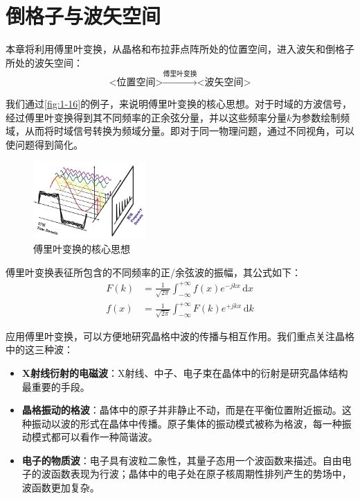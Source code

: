 \chapter{倒格子与波矢空间}\label{chap:2}
    本章将利用傅里叶变换，从晶格和布拉菲点阵所处的位置空间，进入波矢和倒格子所处的波矢空间：
    \[
        \mbox{<位置空间>}\xrightarrow{\mbox{傅里叶变换}}\mbox{<波矢空间>} 
    \]

    我们通过\autoref{fig:1-16}的例子，来说明傅里叶变换的核心思想。对于时域的方波信号，经过傅里叶变换得到其不同频率的正余弦分量，并以这些频率分量$k$为参数绘制频域，从而将时域信号转换为频域分量。即对于同一物理问题，通过不同视角，可以使问题得到简化。

    \begin{figure}[!htbp]
        \centering    
        \includegraphics[height=8em, keepaspectratio=true]{pic/2-01}
        \caption{傅里叶变换的核心思想}
        \label{fig:1-16}
    \end{figure}

    傅里叶变换表征所包含的不同频率的正/余弦波的振幅，其公式如下：
    \begin{align}
        F(k)&=\frac{1}{\sqrt{2\pi}}\int_{-\infty}^{+\infty} f(x)e^{-jkx} \,\mathrm{d}x\\
        f(x)&=\frac{1}{\sqrt{2\pi}}\int_{-\infty}^{+\infty} F(k)e^{+jkx} \,\mathrm{d}k 
    \end{align}
           
    应用傅里叶变换，可以方便地研究晶格中波的传播与相互作用。我们重点关注晶格中的这三种波：
    \begin{itemize}[itemsep=0pt,parsep=0pt]
        \item \textbf{X射线衍射的电磁波}：X射线、中子、电子束在晶体中的衍射是研究晶体结构最重要的手段。
        \item \textbf{晶格振动的格波}：晶体中的原子并非静止不动，而是在平衡位置附近振动。这种振动以波的形式在晶体中传播。原子集体的振动模式被称为格波，每一种振动模式都可以看作一种简谐波。
        \item \textbf{电子的物质波}：电子具有波粒二象性，其量子态用一个波函数来描述。自由电子的波函数表现为行波；晶体中的电子处在原子核周期性排列产生的势场中，波函数更加复杂。
    \end{itemize}

